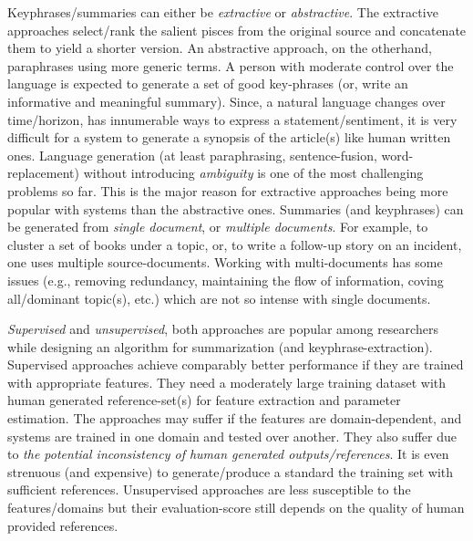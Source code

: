 \documentclass[a4paper]{report}
\begin{document}
\par Keyphrases/summaries can either be \emph{extractive} or \emph{abstractive}. The extractive approaches select/rank the salient pisces from the original source and concatenate them to yield a shorter version. An abstractive approach, on the otherhand, paraphrases using more generic terms. A person with moderate control over the language is expected to generate a set of good key-phrases (or, write an informative and meaningful summary). Since, a natural language changes over time/horizon, has innumerable ways to express a statement/sentiment, it is very difficult for a system to generate a synopsis of the article(s) like human written ones. Language generation (at least paraphrasing, sentence-fusion, word-replacement) without introducing \emph{ambiguity} is one of the most challenging problems so far. This is the major reason for extractive approaches being more popular with systems than the abstractive ones. Summaries (and keyphrases) can be generated from \emph{single document}, or \emph{multiple documents}. For example, to cluster a set of books under a topic, or, to write a follow-up story on an incident, one uses multiple source-documents. Working with multi-documents has some issues (e.g., removing redundancy, maintaining the flow of information, coving all/dominant topic(s), etc.) which are not so intense with single documents.\\ 
\par \emph{Supervised} and \emph{unsupervised}, both approaches are popular among researchers while designing an algorithm for summarization (and keyphrase-extraction). Supervised approaches achieve comparably better performance if they are trained with appropriate features. They need a moderately large training dataset with human generated reference-set(s) for feature extraction and parameter estimation. The approaches may suffer if the features are domain-dependent, and systems are trained in one domain and tested over another. They also suffer due to \emph{the potential inconsistency of human generated outputs/references}. It is even strenuous (and expensive) to generate/produce a standard the training set with sufficient references. Unsupervised approaches are less susceptible to the features/domains but their evaluation-score still depends on the quality of human provided references.\\%
\end{document}

